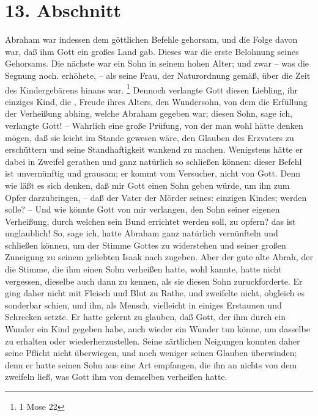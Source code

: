 \section{13. Abschnitt} \label{kap4_ab13}

Abraham  war indessen dem göttlichen Befehle gehorsam,
und die Folge davon war,
daß ihm Gott ein großes Land gab. Dieses war die erste Belohnung seines
Gehorsams. Die nächste war ein Sohn in seinem hohen Alter; und zwar -- was die
Segnung noch. erhöhete, -- als seine Frau, der Naturordnung gemäß, über die Zeit
des Kindergebärens hinans war.
\footnote{1 Mose 22}
Dennoch verlangte Gott diesen
Liebling, ihr einziges Kind, die , Freude ihres Alters, den Wundersohn, von dem
die Erfüllung der Verheißung abhing, welche Abraham gegeben war; diesen Sohn,
sage ich, verlangte Gott! -- Wahrlich eine große Prüfung, von der man wohl hätte
denken mögen, daß sie leicht im Stande gewesen wäre, den Glauben des Erzvaters
zu erschüttern und seine Standhaftigkeit wankend zu machen. Wenigstens hätte er
dabei in Zweifel gerathen und ganz natürlich so schließen können: dieser Befehl
ist unvernünftig und grausam; er kommt vom Versucher, nicht von Gott. Denn wie
läßt es sich denken, daß mir Gott einen Sohn geben würde, um ihn zum Opfer
darzubringen, -- daß der Vater der Mörder seines: einzigen Kindes; werden solle?
-- Und wie könnte Gott von mir verlangen, den Sohn seiner eigenen Verheißung,
durch welchen sein Bund errichtet werden soll, zu opfern? das ist unglaublich!
So, sage ich, hatte Abraham ganz natürlich vernünfteln und schließen können, um
der Stimme Gottes zu widerstehen und seiner großen Zuneigung zu seinem geliebten
Isaak  nach zugeben. Aber der gute alte Abrah, der die
Stimme, die ihm einen
Sohn verheißen hatte, wohl kannte, hatte nicht vergessen, dieselbe auch dann zu
kennen, als sie diesen Sohn zuruckforderte. Er ging daher nicht mit Fleisch und
Blut zu Rathe, und zweifelte nicht, obgleich es sonderbar schien, und ihn, als
Mensch, vielleicht in einiges Erstaunen und Schrecken setzte. Er hatte gelernt
zu glauben, daß Gott, der ihm durch ein Wunder ein Kind gegeben habe, auch
wieder ein Wunder tun könne, um dasselbe zu erhalten oder wiederherzustellen.
Seine zärtlichen Neigungen konnten daher seine Pflicht nicht überwiegen, und
noch weniger seinen Glauben überwinden; denn er hatte seinen Sohn aus eine Art
empfangen, die ihn an nichts von dem zweifeln ließ, was Gott ihm von demselben
verheißen hatte.

\medskip

